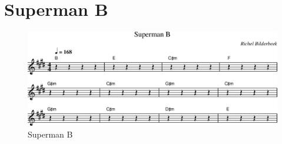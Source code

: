 \chapter{Superman B}



\begin{figure}[!htbp]
  \includegraphics[width=\textwidth,height=\textheight,keepaspectratio]{../songs/57_superman_b.png}
  \caption{Superman B}
  \label{fig:57_superman_b}
\end{figure}
